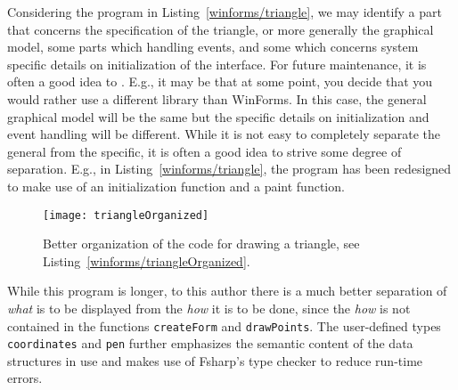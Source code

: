 Considering the program in Listing~\ref{winforms/triangle}, we may identify a part that concerns the specification of the triangle, or more generally the graphical model, some parts which handling events, and some which concerns system specific details on initialization of the interface. For future maintenance, it is often a good idea to . E.g., it may be that at some point, you decide that you would rather use a different library than WinForms. In this case, the general graphical model will be the same but the specific details on initialization and event handling will be different. While it is not easy to completely separate the general from the specific, it is often a good idea to strive some degree of separation. E.g., in Listing~\ref{winforms/triangle}, the program has been redesigned to make use of an initialization function and a paint function.
%
%
\begin{figure}
  \centering
  \texttt{[image: triangleOrganized]}
  \caption{Better organization of the code for drawing a triangle, see Listing~\ref{winforms/triangleOrganized}.}
  \label{fig:triangleOrganized}
\end{figure}
While this program is longer, to this author there is a much better separation of {\em what} is to be displayed from the {\em how} it is to be done, since the {\em how} is not contained in the functions \lstinline!createForm! and \lstinline!drawPoints!. The user-defined types \lstinline!coordinates! and \lstinline!pen! further emphasizes the semantic content of the data structures in use and makes use of Fsharp's type checker to reduce run-time errors.

